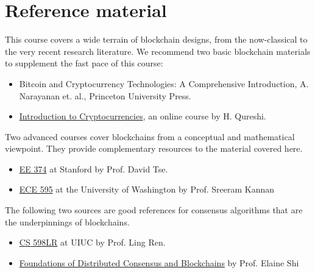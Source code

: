 \documentclass{article}
\begin{document}
\section*{Reference material}

This course covers a wide terrain of blockchain designs, from the now-classical to the very recent research literature. We recommend two basic blockchain materials to supplement the fast pace of this course:
\begin{itemize}
    \item Bitcoin and Cryptocurrency Technologies: A Comprehensive Introduction, A. Narayanan et. al., Princeton University Press. 
    \item \href{https://nakamoto.com/introduction-to-cryptocurrency/}{Introduction to  Cryptocurrencies}, an online course by H. Qureshi. 
\end{itemize}
Two advanced courses cover blockchains from a conceptual and mathematical viewpoint. They provide complementary resources to the material covered here. 
\begin{itemize}
    \item \href{http://web.stanford.edu/class/ee374/}{EE 374} at Stanford by Prof. David Tse. 
    \item \href{https://ece595uwseattle.github.io/}{ECE 595} at the University of Washington by Prof. Sreeram Kannan
\end{itemize}
The following two sources are good references for consensus algorithms that are the underpinnings of blockchains.
\begin{itemize}
    \item \href{https://sites.google.com/view/cs598cal}{CS 598LR} at UIUC by Prof. Ling Ren. 
    \item \href{https://www.distributedconsensus.net}{Foundations of Distributed Consensus and Blockchains} by Prof. Elaine Shi
\end{itemize}


\end{document}
